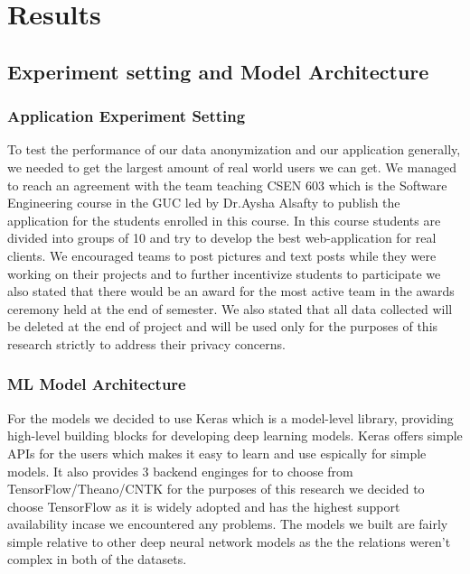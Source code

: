 \chapter{Results}
\label{chap:Four}

\section{Experiment setting and Model Architecture}
\label{sec:expset}

\subsection{Application Experiment Setting}
\label{subsec:tool}
To test the performance of our data anonymization and our application generally, we needed to get the largest amount of real world users we can get. We managed to reach an agreement with the team teaching CSEN 603 which is the Software Engineering course in the GUC led by Dr.Aysha Alsafty
to publish the application for the students enrolled in this course. In this course students are divided into groups of 10 and try to develop the best web-application for real clients.
We encouraged teams to post pictures and text posts while they were working on their projects and to further incentivize students to participate we also stated that there would be an award
for the most active team in the awards ceremony held at the end of semester.
We also stated that all data collected will be deleted at the end of project and will be used only for the purposes of this research strictly to address their privacy concerns.
\subsection{ML Model Architecture}
\label{subsec:data}
For the models we decided to use Keras\cite{chollet2015keras} which is a model-level library, providing high-level building blocks for developing deep learning models. Keras offers simple APIs for the users which makes it easy to learn and use espically for simple models.
It also provides 3 backend enginges for to choose from TensorFlow/Theano/CNTK for the purposes of this research we decided to choose TensorFlow as it is widely adopted and has the highest support availability incase we encountered any problems.
The models we built are fairly simple relative to other deep neural network models as the the relations weren't complex in both of the datasets.\par

